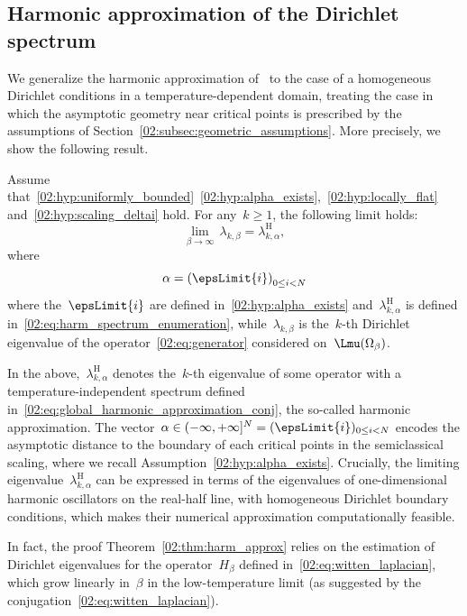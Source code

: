     \subsection{Harmonic approximation of the Dirichlet spectrum}
    \label{02:subsec:harm}
    We generalize the harmonic approximation of~\cite{S83,CFKS87} to the case of a homogeneous Dirichlet conditions in a temperature-dependent domain, treating the case in which the asymptotic geometry near critical points is prescribed by the assumptions of Section~\ref{02:subsec:geometric_assumptions}.
    More precisely, we show the following result.
    \begin{theorem}
        \label{02:thm:harm_approx}
        Assume that~\eqref{02:hyp:uniformly_bounded}~\eqref{02:hyp:alpha_exists},~\eqref{02:hyp:locally_flat} and~\eqref{02:hyp:scaling_deltai} hold.
        For any~$k\geq 1$, the following limit holds:
        \begin{equation}
            \label{02:eq:harm_limit}
            \underset{\beta\to\infty}{\lim}\,\lambda_{k,\beta} = \lambda_{k,\alpha}^{\mathrm{H}},
        \end{equation}
        where
        \begin{equation}
            \label{02:eq:global_alpha}
            \alpha = \left(\epsLimit{i}\right)_{0\leq i < N}
        \end{equation}
        where the~$\epsLimit{i}$ are defined in~\eqref{02:hyp:alpha_exists} and~$\lambda_{k,\alpha}^{\mathrm{H}}$ is defined in~\eqref{02:eq:harm_spectrum_enumeration}, while~$\lambda_{k,\beta}$ is the~$k$-th Dirichlet eigenvalue of the operator~\eqref{02:eq:generator} considered on~$\Lmu(\Omega_\beta)$.
    \end{theorem}
    In the above,~$\lambda_{k,\alpha}^{\mathrm H}$ denotes the~$k$-th eigenvalue of some operator with a temperature-independent spectrum defined in~\eqref{02:eq:global_harmonic_approximation_conj}, the so-called harmonic approximation. The vector~$\alpha\in(-\infty,+\infty]^{N} = (\epsLimit{i})_{0\leq i < N}$ encodes the asymptotic distance to the boundary of each critical points in the semiclassical scaling, where we recall Assumption~\eqref{02:hyp:alpha_exists}.
    Crucially, the limiting eigenvalue~$\lambda_{k,\alpha}^{\mathrm{H}}$ can be expressed in terms of the eigenvalues of one-dimensional harmonic oscillators on the real-half line, with homogeneous Dirichlet boundary conditions, which makes their numerical approximation computationally feasible.

    In fact, the proof Theorem~\ref{02:thm:harm_approx} relies on the estimation of Dirichlet eigenvalues for the operator~$H_\beta$ defined in~\eqref{02:eq:witten_laplacian}, which grow linearly in~$\beta$ in the low-temperature limit (as suggested by the conjugation~\eqref{02:eq:witten_laplacian}).

